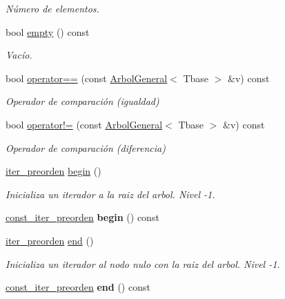 \begin{DoxyCompactItemize}
\begin{DoxyCompactList}\small\item\em Número de elementos. \end{DoxyCompactList}\item 
bool \hyperlink{classArbolGeneral_ab7b59c8fe7e74f78f3533965460a6c9a}{empty} () const 
\begin{DoxyCompactList}\small\item\em Vacío. \end{DoxyCompactList}\item 
bool \hyperlink{classArbolGeneral_a5c7db1c3f26d29b887ba906d02397a8d}{operator==} (const \hyperlink{classArbolGeneral}{Arbol\-General}$<$ Tbase $>$ \&v) const 
\begin{DoxyCompactList}\small\item\em Operador de comparación (igualdad) \end{DoxyCompactList}\item 
bool \hyperlink{classArbolGeneral_ab5b783cb068a394511f99e08a827cdda}{operator!=} (const \hyperlink{classArbolGeneral}{Arbol\-General}$<$ Tbase $>$ \&v) const 
\begin{DoxyCompactList}\small\item\em Operador de comparación (diferencia) \end{DoxyCompactList}\item 
\hypertarget{classArbolGeneral_ad37565ad17a40d83d38f824d87f21f22}{\hyperlink{classArbolGeneral_1_1iter__preorden}{iter\-\_\-preorden} \hyperlink{classArbolGeneral_ad37565ad17a40d83d38f824d87f21f22}{begin} ()}\label{classArbolGeneral_ad37565ad17a40d83d38f824d87f21f22}

\begin{DoxyCompactList}\small\item\em Inicializa un iterador a la raiz del arbol. Nivel -\/1. \end{DoxyCompactList}\item 
\hypertarget{classArbolGeneral_a56d1a04fdfb2d84c4565adf9e33806ed}{\hyperlink{classArbolGeneral_1_1const__iter__preorden}{const\-\_\-iter\-\_\-preorden} {\bfseries begin} () const }\label{classArbolGeneral_a56d1a04fdfb2d84c4565adf9e33806ed}

\item 
\hypertarget{classArbolGeneral_a2c30536d83c6bef2c070478ae886e2d1}{\hyperlink{classArbolGeneral_1_1iter__preorden}{iter\-\_\-preorden} \hyperlink{classArbolGeneral_a2c30536d83c6bef2c070478ae886e2d1}{end} ()}\label{classArbolGeneral_a2c30536d83c6bef2c070478ae886e2d1}

\begin{DoxyCompactList}\small\item\em Inicializa un iterador al nodo nulo con la raiz del arbol. Nivel -\/1. \end{DoxyCompactList}\item 
\hypertarget{classArbolGeneral_a29a6a8d0720fc97bcc2a18e384a76034}{\hyperlink{classArbolGeneral_1_1const__iter__preorden}{const\-\_\-iter\-\_\-preorden} {\bfseries end} () const }\label{classArbolGeneral_a29a6a8d0720fc97bcc2a18e384a76034}

\end{DoxyCompactItemize}
